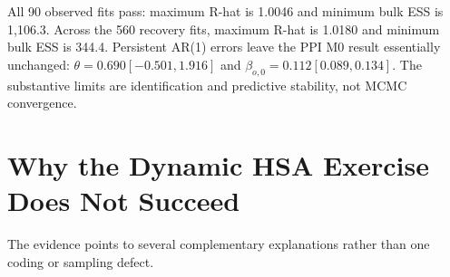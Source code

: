 \documentclass[11pt]{article}
\begin{document}
\begin{table}[H]
\centering
\caption{Oil-control convergence; firm-weighted unemployment-gap cells}

\end{table}

All 90 observed fits pass: maximum R-hat is 1.0046 and minimum bulk ESS is 1,106.3. Across
the 560 recovery fits, maximum R-hat is 1.0180 and minimum bulk ESS is 344.4. Persistent
AR(1) errors leave the PPI M0 result essentially unchanged:
$\theta=0.690[-0.501,1.916]$ and
$\beta_{o,0}=0.112[0.089,0.134]$. The substantive limits are identification and predictive
stability, not MCMC convergence.

\section{Why the Dynamic HSA Exercise Does Not Succeed}

The evidence points to several complementary explanations rather than one coding or sampling
defect.
\end{document}
